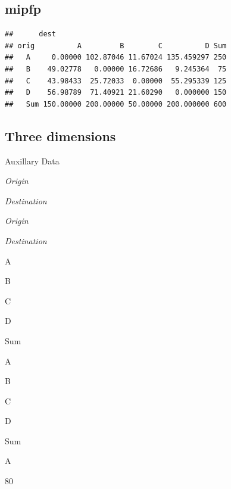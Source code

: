 \documentclass[
]{book}
\newenvironment{Shaded}{\begin{snugshade}}{\end{snugshade}}
\newcommand{\AttributeTok}[1]{\textcolor[rgb]{0.77,0.63,0.00}{#1}}
\newcommand{\CommentTok}[1]{\textcolor[rgb]{0.56,0.35,0.01}{\textit{#1}}}
\newcommand{\DecValTok}[1]{\textcolor[rgb]{0.00,0.00,0.81}{#1}}
\newcommand{\FunctionTok}[1]{\textcolor[rgb]{0.00,0.00,0.00}{#1}}
\newcommand{\NormalTok}[1]{#1}
\newcommand{\OtherTok}[1]{\textcolor[rgb]{0.56,0.35,0.01}{#1}}
\newcommand{\SpecialCharTok}[1]{\textcolor[rgb]{0.00,0.00,0.00}{#1}}
\begin{document}
\hypertarget{mipfp-4}{%
\subsection{mipfp}\label{mipfp-4}}

\begin{Shaded}
\end{Shaded}

\begin{verbatim}
##      dest
## orig          A         B        C          D Sum
##   A     0.00000 102.87046 11.67024 135.459297 250
##   B    49.02778   0.00000 16.72686   9.245364  75
##   C    43.98433  25.72033  0.00000  55.295339 125
##   D    56.98789  71.40921 21.60290   0.000000 150
##   Sum 150.00000 200.00000 50.00000 200.000000 600
\end{verbatim}

\hypertarget{three-dimensions}{%
\subsection{Three dimensions}\label{three-dimensions}}

Auxillary Data

\emph{Origin}

\emph{Destination}

\emph{Origin}

\emph{Destination}

A

B

C

D

Sum

A

B

C

D

Sum

A

80
\end{document}
